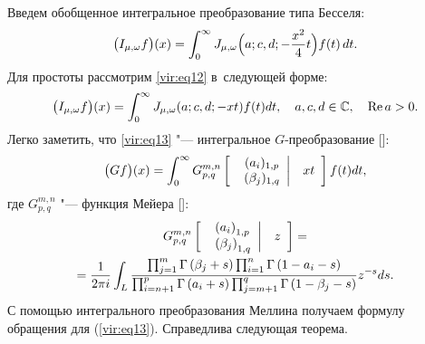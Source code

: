 \smallskip
{} 
Введем обобщенное интегральное преобразование типа Бесселя:
\begin{equation}
\label{vir:eq12}
\bigl( I_{\mu ,\omega } f \bigr)( x )=
\int_0^\infty  J_{\mu ,\omega } \Bigl( a; c, d; -\frac{x^2}{4}t \Bigr) 
f( t )\,dt.
\end{equation}
Для простоты рассмотрим \eqref{vir:eq12} в~следующей форме:
\begin{equation}
\label{vir:eq13}
\bigl( I_{\mu ,\omega } f \bigr) ( x )=
\int_0^\infty 
J_{\mu ,\omega}  (a;c,d;-xt ) f( t )dt, \quad a, c, d \in \mathbb C,\quad \mathop{\rm Re} a>0.
\end{equation}
Легко заметить, что \eqref{vir:eq13} "--- интегральное $G$-преобразование []:
\begin{equation}
\label{vir:eq14}
\bigl( {Gf} \bigr) ( x )=\int_0^\infty G_{p,q}^{m,n} 
\left[ \begin{array}{*{2}c}
 \left. \begin{array}{*{2}c}
 ( a_i )_{1,p}   \\
 (\beta _j )_{1,q}  \\
\end{array}  \right| & xt \\
\end{array}  \right] f ( t )dt,
\end{equation}
где $G_{p,q}^{m,n} $ "--- функция Мейера []:
\begin{multline}
\label{vir:eq15}
G_{p,q}^{m,n} \left[ {{\begin{array}{*{20}c}
 {\left. {{\begin{array}{*{20}c}
 {\left( {a_i } \right)_{1,p} } \hfill \\
 {\left( {\beta _j } \right)_{1,q} } \hfill \\
\end{array} }} \right|} \hfill & z \hfill \\
\end{array} }} \right]=
\\
=
\frac{1}{2\pi i}\int_L 
{\frac{\prod _{j=1}^m {\Gamma \left( {\beta _j +s} \right)} 
\prod _{i=1}^n {\Gamma \left( {1-a_i -s} \right)} 
}{\prod _{i=n+1}^p {\Gamma \left( {a_i +s} \right)} 
\prod _{j=m+1}^q {\Gamma \left( {1-\beta _j -s} \right)} }} z^{-s}ds.
\end{multline}
С помощью интегрального преобразования Меллина получаем формулу обращения 
для (\ref{vir:eq13}). Справедлива следующая теорема.

